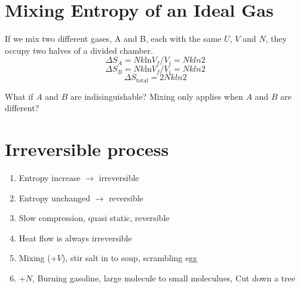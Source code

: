\documentclass[twoside]{article}
\begin{document}
\section{Mixing Entropy of an Ideal Gas}
If we mix two different gases, A and B, each with the same $U$, $V$ and $N$, they occupy two halves of a divided chamber.
\begin{equation}\Delta S_A = Nk\text{ln} V_f/V_i = Nkln2 \end{equation}
\begin{equation}\Delta S_B = Nk\text{ln} V_f/V_i = Nkln2 \end{equation}
\begin{equation}\Delta S_\text{total} = 2Nkln2 \end{equation}

What if $A$ and $B$ are indisinguishable?
Mixing only applies when $A$ and $B$ are different?
\begin{figure}[h]
\centering
{}
\end{figure}


\section{Irreversible process}
\begin{enumerate}
\item Entropy increase $\rightarrow$ irreversible
\item Entropy unchanged $\rightarrow$ reversible
\item Slow compression, quasi static, reversible
\item Heat flow is always irreversible
\item Mixing (+$V$), stir salt in to soup, scrambling egg
\item +$N$, Burning gasoline, large molecule to small moleculues, Cut down a tree
\end{enumerate}
\end{document}
